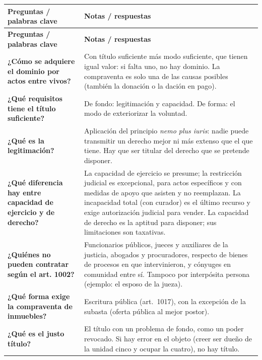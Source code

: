 \documentclass[12pt,oneside]{book}
\begin{document}
{\small
\begin{longtable}{@{}>{\raggedright\arraybackslash}p{}>{\raggedright\arraybackslash}p{}@{}}
\toprule
\textbf{Preguntas / palabras clave} & \textbf{Notas / respuestas} \\
\midrule
\endfirsthead
\toprule
\textbf{Preguntas / palabras clave} & \textbf{Notas / respuestas} \\
\midrule
\endhead
\bottomrule
\endfoot

\textbf{¿Cómo se adquiere el dominio por actos entre vivos?} &
Con título suficiente más modo suficiente, que tienen igual valor: si falta uno, no hay dominio. La compraventa es solo una de las causas posibles (también la donación o la dación en pago). \\[0.6em]

\textbf{¿Qué requisitos tiene el título suficiente?} &
De fondo: legitimación y capacidad. De forma: el modo de exteriorizar la voluntad. \\[0.6em]

\textbf{¿Qué es la legitimación?} &
Aplicación del principio \emph{nemo plus iuris}: nadie puede transmitir un derecho mejor ni más extenso que el que tiene. Hay que ser titular del derecho que se pretende disponer. \\[0.6em]

\textbf{¿Qué diferencia hay entre capacidad de ejercicio y de derecho?} &
La capacidad de ejercicio se presume; la restricción judicial es excepcional, para actos específicos y con medidas de apoyo que asisten y no reemplazan. La incapacidad total (con curador) es el último recurso y exige autorización judicial para vender. La capacidad de derecho es la aptitud para disponer; sus limitaciones son taxativas. \\[0.6em]

\textbf{¿Quiénes no pueden contratar según el art. 1002?} &
Funcionarios públicos, jueces y auxiliares de la justicia, abogados y procuradores, respecto de bienes de procesos en que intervinieron, y cónyuges en comunidad entre sí. Tampoco por interpósita persona (ejemplo: el esposo de la jueza). \\[0.6em]

\textbf{¿Qué forma exige la compraventa de inmuebles?} &
Escritura pública (art.~1017), con la excepción de la subasta (oferta pública al mejor postor). \\[0.6em]

\textbf{¿Qué es el justo título?} &
El título con un problema de fondo, como un poder revocado. Si hay error en el objeto (creer ser dueño de la unidad cinco y ocupar la cuatro), no hay título. \\[0.6em]


\end{longtable}}
\end{document}
